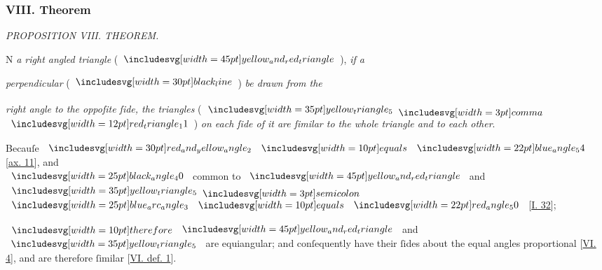 \documentclass[11pt,preview]{standalone}
\begin{document}
\subsubsection{VIII. Theorem}

\begin{minipage}[t]{0.43\textwidth}
    \vspace{20pt}
    
\end{minipage}%
\hfill
\begin{minipage}[t]{0.54\textwidth}
    \begin{center}
        \textit{PROPOSITION VIII. THEOREM.}\label{book6pr8} \\
    \end{center}

    \hfill

    \begin{center}
        \raggedright \lettrine[lines=3, loversize=1, nindent=0pt]{}{}N \textit{a right angled triangle} (\hspace{-1ex}$\img[0][0][45]{yellow_and_red_triangle}$\hspace{-1ex}), \textit{if a}
    \end{center}
    \textit{perpendicular} (\hspace{-1ex}$\blackline$\hspace{-1ex}) \textit{be drawn from the}
\end{minipage}
\raggedright \textit{right angle to the oppoſite ſide, the triangles} (\hspace{-1ex}$\img[0][0][35]{yellow_triangle_5} \bcomma$ $\img[0][0][12]{red_triangle_11}$\hspace{-1ex}) \textit{on each ſide of it are ſimilar to the whole triangle and to each other}.

\hfill

\hfill

\begin{center}
    Becauſe $\img[0][0][30]{red_and_yellow_angle_2} \bequals \img[0][0][22]{blue_angle_54}$ [\hyperref[ax11]{ax. 11}], and\\
    $\img{black_angle_40}$ common to $\img[0][0][45]{yellow_and_red_triangle}$ and $\img[0][0][35]{yellow_triangle_5} \bsemicolon$\\
    $\img{blue_arc_angle_3} \bequals \img[0][0][22]{red_angle_50}$ [\hyperref[book1pr32]{\textsc{I.} 32}];
\end{center}

$\btherefore \img[0][0][45]{yellow_and_red_triangle}$ and $\img[0][0][35]{yellow_triangle_5}$ are equiangular; and conſequently have their ſides about the equal angles proportional [\hyperref[book6pr4]{\textsc{VI.} 4}], and are therefore ſimilar [\hyperref[book6def1]{\textsc{VI.} def. 1}].
\end{document}
